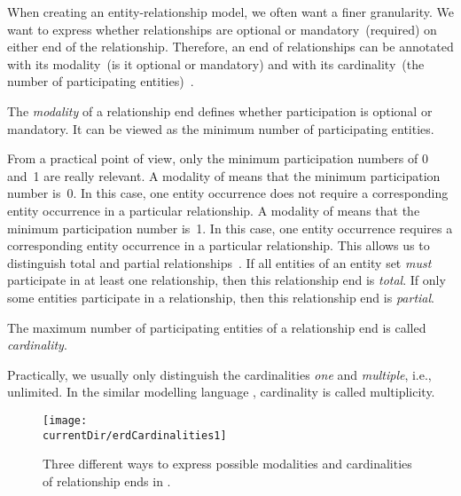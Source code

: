 When creating an entity-relationship model, we often want a finer granularity.
We want to express whether relationships are optional or mandatory~(required) on either end of the relationship.
Therefore, an end of relationships can be annotated with its modality~(is it optional or mandatory) and with its cardinality~(the number of participating entities)~\cite{R2024CDS:E}.
%
\begin{definition}
The \emph{modality} of a relationship end defines whether participation is optional or mandatory. %
It can be viewed as the minimum number of participating entities.%
\end{definition}%
%
From a practical point of view, only the minimum participation numbers of 0 and~1 are really relevant.
A modality of  means that the minimum participation number is~0.
In this case, one entity occurrence does not require a corresponding entity occurrence in a particular relationship.
A modality of  means that the minimum participation number is~1.
In this case, one entity occurrence requires a corresponding entity occurrence in a particular relationship.
This allows us to distinguish total and partial relationships~\cite{P2006CITRD:ERMI,V1999C5DMS:CDUTERM}.
If all entities of an entity set \emph{must} participate in at least one relationship, then this relationship end is \emph{total}.
If only some entities participate in a relationship, then this relationship end is \emph{partial}.
%
\begin{definition}
The maximum number of participating entities of a relationship end is called \emph{cardinality}.%
\end{definition}%
%
Practically, we usually only distinguish the cardinalities \emph{one} and \emph{multiple}, i.e., unlimited.%
In the similar modelling language , cardinality is called multiplicity.

\begin{figure}%
\centering%
\texttt{[image: \\currentDir/erdCardinalities1]}%
\caption{Three different ways to express possible modalities and cardinalities of relationship ends in .}%
\label{fig:erdCardinalities1}%
\end{figure}%

